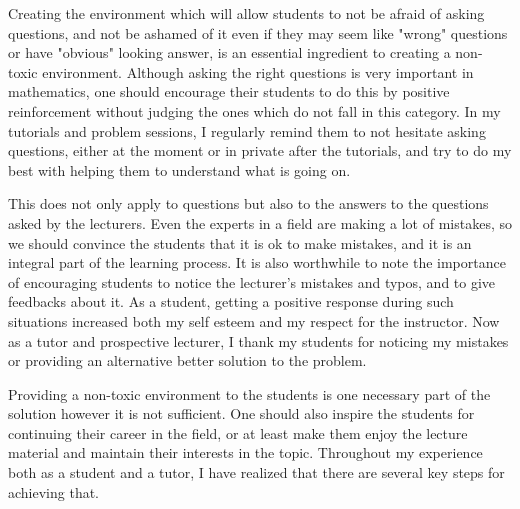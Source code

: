 \documentclass{article}
\begin{document}
\vspace{5mm}

\par Creating the environment which will allow students to not be afraid of asking questions, and not be ashamed of it even if they may seem like "wrong" questions or have "obvious" looking answer, is an essential ingredient to creating a non-toxic environment. Although asking the right questions is very important in mathematics, one should encourage their students to do this by positive reinforcement without judging the ones which do not fall in this category. In my tutorials and problem sessions, I regularly remind them to not hesitate asking questions, either at the moment or in private after the tutorials, and try to do my best with helping them to understand what is going on.

\vspace{5mm}

\par This does not only apply to questions but also to the answers to the questions asked by the lecturers. Even the experts in a field are making a lot of mistakes, so we should convince the students that it is ok to make mistakes, and it is an integral part of the learning process. It is also worthwhile to note the importance of encouraging students to notice the lecturer's mistakes and typos, and to give feedbacks about it. As a student, getting a positive response during such situations increased both my self esteem and my respect for the instructor. Now as a tutor and prospective lecturer, I thank my students for noticing my mistakes or providing an alternative better solution to the problem.

\vspace{5mm}

\par Providing a non-toxic environment to the students is one necessary part of the solution however it is not sufficient. One should also inspire the students for continuing their career in the field, or at least make them enjoy the lecture material and maintain their interests in the topic. Throughout my experience both as a student and a tutor, I have realized that there are several key steps for achieving that. 

\vspace{5mm}
\end{document}
